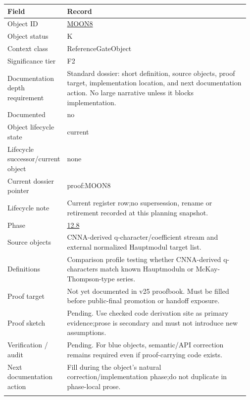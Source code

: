 \begin{longtable}{L{0.16\linewidth} L{0.81\linewidth}}
\hline
\textbf{Field} & \textbf{Record}\\
\hline
Object ID & \hyperlink{object-row-MOON8}{MOON8}\\
\hline\addlinespace[0.20em]
Object status & K\\
\hline\addlinespace[0.20em]
Context class & ReferenceGateObject\\
\hline\addlinespace[0.20em]
Significance tier & F2\\
\hline\addlinespace[0.20em]
Documentation depth requirement & Standard dossier: short definition, source objects, proof target, implementation location, and next documentation action. No large narrative unless it blocks implementation.\\
\hline\addlinespace[0.20em]
Documented & no\\
\hline\addlinespace[0.20em]
Object lifecycle state & current\\
\hline\addlinespace[0.20em]
Lifecycle successor/\allowbreak{}current object & none\\
\hline\addlinespace[0.20em]
Current dossier pointer & proof:MOON8\\
\hline\addlinespace[0.20em]
Lifecycle note & Current register row;\newline no supersession, rename or retirement recorded at this planning snapshot.\\
\hline\addlinespace[0.20em]
Phase & \hyperlink{phase-row-12-8}{12.8}\\
\hline\addlinespace[0.20em]
Source objects & CNNA-derived q-character/\allowbreak{}coefficient stream and external normalized Hauptmodul target list.\\
\hline\addlinespace[0.20em]
Definitions & Comparison profile testing whether CNNA-derived q-characters match known Hauptmoduln or McKay-Thompson-type series.\\
\hline\addlinespace[0.20em]
Proof target & Not yet documented in v25 proofbook. Must be filled before public-final promotion or handoff exposure.\\
\hline\addlinespace[0.20em]
Proof sketch & Pending. Use checked code derivation site as primary evidence;\newline prose is secondary and must not introduce new assumptions.\\
\hline\addlinespace[0.20em]
Verification /\allowbreak{} audit & Pending. For blue objects, semantic/\allowbreak{}API correction remains required even if proof-carrying code exists.\\
\hline\addlinespace[0.20em]
Next documentation action & Fill during the object's natural correction/\allowbreak{}implementation phase;\newline do not duplicate in phase-local prose.\\
\hline\addlinespace[0.20em]
\end{longtable}
